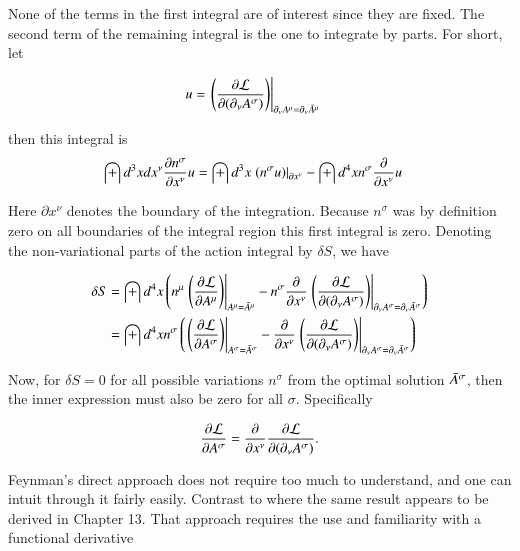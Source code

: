 None of the terms in the first integral are of interest since they are fixed.  The second term of the remaining integral is the one to integrate by
parts.  For short, let

\begin{align*}
u &= \left. \left( \PD{(\partial_\nu A^\sigma)}{\LL} \right) \right\vert_{\partial_\nu A^\mu = \partial_\nu \barA^\mu}
\end{align*}

then this integral is
\begin{align*}
\int d^3 x d x^\nu \PD{x^\nu}{n^\sigma} u 
&= \int d^3 x \left. \left( {n^\sigma} u \right) \right\vert_{\partial x^\nu} - \int d^4 x n^\sigma \PD{x^\nu}{} u
\end{align*}

Here $\partial x^\nu$ denotes the boundary of the integration.  Because $n^\sigma$ was by definition zero on all boundaries of the
integral region this first integral is zero.  Denoting the non-variational parts of the action integral by $\delta S$, we have

\begin{align*}
\delta S
&= \int d^4 x \left(
n^\mu \left. \left( \PD{A^\mu}{\LL} \right) \right\vert_{A^\mu = \barA^\mu} 
- n^\sigma \PD{x^\nu}{} \left. \left( \PD{(\partial_\nu A^\sigma)}{\LL} \right) \right\vert_{\partial_\nu A^\sigma = \partial_\nu \barA^\sigma}
\right) \\
&= \int d^4 x
n^\sigma
\left(
\left. \left( \PD{A^\sigma}{\LL} \right) \right\vert_{A^\sigma = \barA^\sigma} 
- \PD{x^\nu}{} \left. \left( \PD{(\partial_\nu A^\sigma)}{\LL} \right) \right\vert_{\partial_\nu A^\sigma = \partial_\nu \barA^\sigma}
\right)
\end{align*}

Now, for $\delta S = 0$ for all possible variations $n^\sigma$ from the optimal solution $\barA^\sigma$, then the inner expression must also be zero
for all $\sigma$.  Specifically

\begin{align}\label{eqn:fieldLag:eulerLagrangeField}
\PD{A^\sigma}{\LL} = \PD{x^\nu}{} \PD{(\partial_\nu A^\sigma)}{\LL}.
\end{align}

Feynman's direct approach does not require too much to understand, and one can intuit through it fairly easily.  Contrast to 
\cite{goldstein1951cm}
where the same result appears to be derived in Chapter 13.  That approach requires the use and familiarity with a functional derivative

